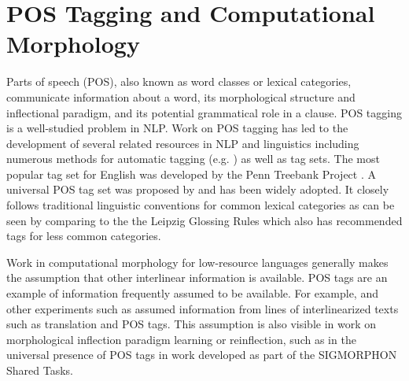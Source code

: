 \section{POS Tagging and Computational Morphology}
\label{sec:POSlitreview}

Parts of speech (POS), also known as word classes or lexical categories, communicate information about a word, its morphological structure and inflectional paradigm, and its potential grammatical role in a clause. POS tagging is a well-studied problem in NLP. Work on POS tagging has led to the development of several related resources in NLP and linguistics including numerous methods for automatic tagging (e.g. \citet{kupiec_robust_1992,toutanova_bayesian_2008}) as well as tag sets. The most popular tag set for English was developed by the Penn Treebank Project \cite{taylor_penn_2003}. A universal POS tag set was proposed by \cite{petrov_universal_2012} and has been widely adopted. It closely follows traditional linguistic conventions for common lexical categories as can be seen by comparing to the the Leipzig Glossing Rules \citep{leipzig_2008} which also has recommended tags for less common categories.

Work in computational morphology for low-resource languages generally makes the assumption that other interlinear information is available. POS tags are an example of information frequently assumed to be available. For example, 
\citet{mcmillan-major_automating_2020} and other experiments such as \citet{samardzic_automatic_2015} assumed information from lines of interlinearized texts such as translation and POS tags. This assumption is also visible in work on morphological inflection paradigm learning or reinflection, such as in the universal presence of POS tags in work developed as part of the SIGMORPHON Shared Tasks. 
